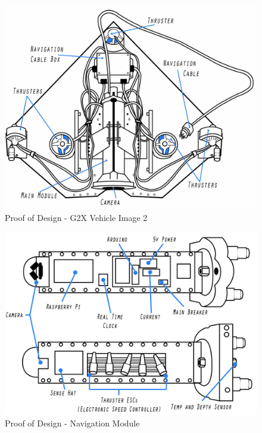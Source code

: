 \documentclass[12pt]{article}
\begin{document}
		\begin{figure}[!htb]
			\centering
			\includegraphics[width = 120mm]{assets/inside_sub.jpg}
			\caption{Proof of Design - G2X Vehicle Image 2 \label{overflow}}
		\end{figure}
	
		\begin{figure}[!htb]
			\centering
			\includegraphics[width = 115mm]{assets/navigation_board.jpg}
			\caption{Proof of Design - Navigation Module \label{overflow}}
		\end{figure}
	
\end{document}
